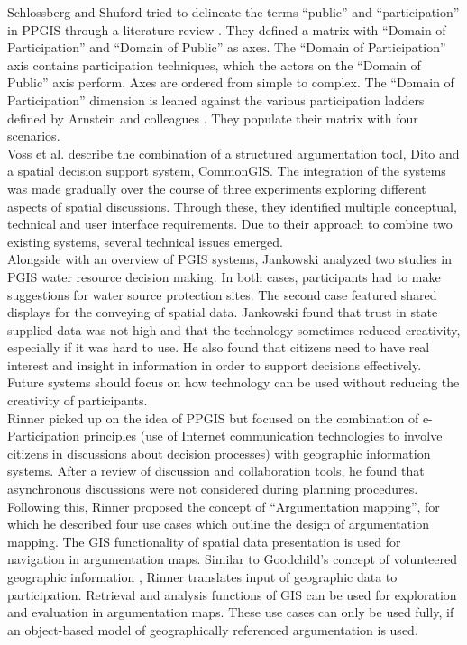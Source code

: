 Schlossberg and Shuford tried to delineate the terms ``public'' and ``participation'' in PPGIS through a literature review \cite{Schlossberg2005_PPGIS}. They defined a matrix with ``Domain of Participation'' and ``Domain of Public'' as axes. The ``Domain of Participation'' axis contains participation techniques, which the actors on the ``Domain of Public'' axis perform. Axes are ordered from simple to complex. The ``Domain of Participation'' dimension is leaned against the various participation ladders defined by Arnstein and colleagues \cite{Arnstein1969_citizen_participation,Wiedemann1993355,Connor1988_new_ladder}. They populate their matrix with four scenarios.\\
Voss et al. \cite{Voss2004_Evolution_PGIS} describe the combination of a structured argumentation tool, Dito and a spatial decision support system, CommonGIS. The integration of the systems was made gradually over the course of three experiments exploring different aspects of spatial discussions. Through these, they identified multiple conceptual, technical and user interface requirements. Due to their approach to combine two existing systems, several technical issues emerged.\\
Alongside with an overview of PGIS systems, Jankowski \cite{Jankowski2005_community_based_pgis} analyzed two studies in PGIS water resource decision making. In both cases, participants had to make suggestions for water source protection sites. The second case featured shared displays for the conveying of spatial data. Jankowski found that trust in state supplied data was not high and that the technology sometimes reduced creativity, especially if it was hard to use. He also found that citizens need to have real interest and insight in information in order to support decisions effectively. Future systems should focus on how technology can be used without reducing the creativity of participants.\\
Rinner \cite{Rinner_ArgumentationMaps} picked up on the idea of PPGIS but focused on the combination of e-Participation principles (use of Internet communication technologies to involve citizens in discussions about decision processes) with geographic information systems. After a review of discussion and collaboration tools, he found that asynchronous discussions were not considered during planning procedures. Following this, Rinner proposed the concept of ``Argumentation mapping'', for which he described four use cases which outline the design of argumentation mapping. The GIS functionality of spatial data presentation is used for navigation in argumentation maps. Similar to Goodchild's concept of volunteered geographic information \cite{goodchild2007citizens}, Rinner translates input of geographic data to participation. Retrieval and analysis functions of GIS can be used for exploration and evaluation in argumentation maps. These use cases can only be used fully, if an object-based model of geographically referenced argumentation is used.\\
